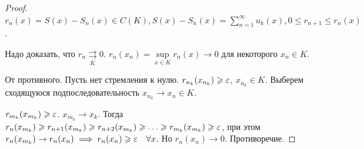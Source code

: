 \begin{proof}
    $r_n(x) = S(x) - S_n(x) \in C(K), S(x) - S_n(x) = \sum\limits_{n=1}^\infty u_k(x), 0 \le r_{n+1} \le r_n(x)$.

    Надо доказать, что $r_n \underset{K}{\rightrightarrows} 0$.  $r_n(x_n) = \sup\limits_{x \in K} r_n(x) \to 0$ для некоторого $x_n \in K$.

    От противного. Пусть нет стремления к нулю.  $r_{n_k}(x_{n_k}) \geqslant \varepsilon$, $x_{n_k} \in K$. Выберем сходящуюся подпоследовательность  $x_{n_k} \to x_n \in K$.

     $r_{m_k}(x_{m_k}) \geqslant \varepsilon$. $x_{m_k} \to x_k$. Тогда  $r_n(x_{m_k}) \geqslant r_{n+1}(x_{m_k}) \geqslant r_{n+2}(x_{m_k}) \geqslant \ldots \geqslant r_{m_k}(x_{m_k}) \geqslant \varepsilon$, при этом $r_n(x_{m_k}) \to r_n(x_n) \implies r_n(x_n) \geqslant \varepsilon \quad \forall x$. Но $r_n(x_n) \to 0$. Противоречие.
\end{proof}
